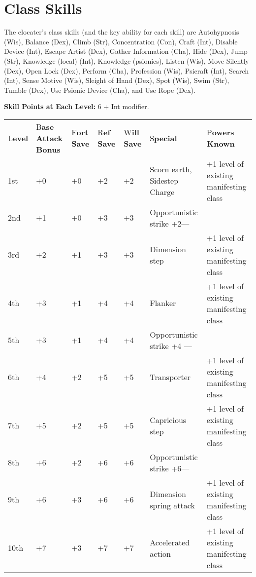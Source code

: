 \documentclass{article}
\begin{document}
\section*{\textbf{Class Skills}}

The elocater's class skills (and the key ability for each skill) are Autohypnosis 
(Wis), Balance (Dex), Climb (Str), Concentration (Con), Craft (Int), Disable Device 
(Int), Escape Artist (Dex), Gather Information (Cha), Hide (Dex), Jump (Str), Knowledge 
(local) (Int), Knowledge (psionics), Listen (Wis), Move Silently (Dex), Open Lock 
(Dex), Perform (Cha), Profession (Wis), Psicraft (Int), Search (Int), Sense Motive 
(Wis), Sleight of Hand (Dex), Spot (Wis), Swim (Str), Tumble (Dex), Use Psionic 
Device (Cha), and Use Rope (Dex).

\textbf{Skill Points at Each Level: }6 + Int modifier.

\vspace{12pt}
\begin{tabular}{|>{\raggedright}p{16pt}|>{\raggedright}p{19pt}|>{\raggedright}p{17pt}|>{\raggedright}p{15pt}|>{\raggedright}p{17pt}|>{\raggedright}p{79pt}|>{\raggedright}p{100pt}|}
\hline
\multicolumn{7}{|p{266pt}|}{\section*{T\textbf{able: The Elocater}}}\tabularnewline
\hline
L\textbf{evel} & B\textbf{ase Attack Bonus} & F\textbf{ort Save} & R\textbf{ef 
Save} & W\textbf{ill Save} & S\textbf{pecial} & P\textbf{owers Known}\tabularnewline
\hline
1st & +0 & +0 & +2 & +2 & Scorn earth, Sidestep Charge & +1 level of existing manifesting 
class\tabularnewline
\hline
2nd & +1 & +0 & +3 & +3 & Opportunistic strike +2--- & \tabularnewline
\hline
3rd & +2 & +1 & +3 & +3 & Dimension step  & +1 level of existing manifesting class\tabularnewline
\hline
4th & +3 & +1 & +4 & +4 & Flanker & +1 level of existing manifesting class\tabularnewline
\hline
5th & +3 & +1 & +4 & +4 & Opportunistic strike +4 --- & \tabularnewline
\hline
6th & +4 & +2 & +5 & +5 & Transporter & +1 level of existing manifesting class\tabularnewline
\hline
7th & +5 & +2 & +5 & +5 & Capricious step & +1 level of existing manifesting class\tabularnewline
\hline
8th & +6 & +2 & +6 & +6 & Opportunistic strike +6--- & \tabularnewline
\hline
9th & +6 & +3 & +6 & +6 & Dimension spring attack & +1 level of existing manifesting 
class\tabularnewline
\hline
10th & +7 & +3 & +7 & +7 & Accelerated action & +1 level of existing manifesting 
class\tabularnewline
\hline
\end{tabular}
\end{document}

